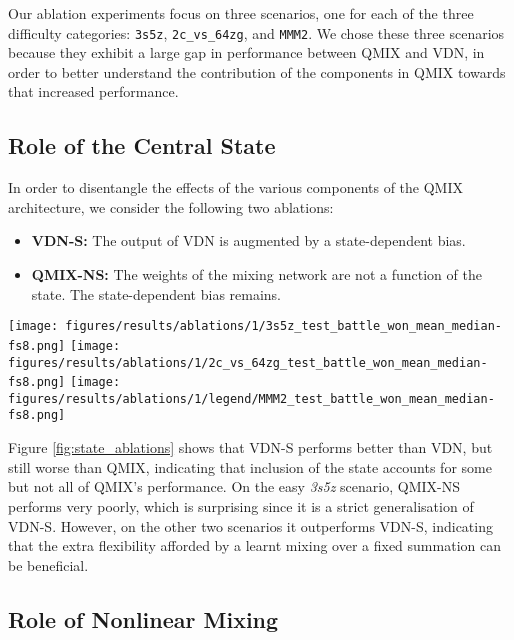 \documentclass[twoside,11pt]{article}
\begin{document}
Our ablation experiments focus on three scenarios, one for each of the three difficulty categories: \texttt{3s5z}, \texttt{2c\_vs\_64zg}, and \texttt{MMM2}.
We chose these three scenarios because they exhibit a large gap in performance between QMIX and VDN, in order to better understand the contribution of the components in QMIX towards that increased performance.

\subsection{Role of the Central State}

In order to disentangle the effects of the various components of the QMIX architecture, we consider the following two ablations:

\begin{itemize}
    \item \textbf{VDN-S:} The output of VDN is augmented by a state-dependent bias.
    \item \textbf{QMIX-NS:} The weights of the mixing network are not a function of the state. The state-dependent bias remains.
\end{itemize}


\begin{figure*}[h!]
    \centering
    \texttt{[image: figures/results/ablations/1/3s5z\_test\_battle\_won\_mean\_median-fs8.png]}
    \texttt{[image: figures/results/ablations/1/2c\_vs\_64zg\_test\_battle\_won\_mean\_median-fs8.png]}
    \texttt{[image: figures/results/ablations/1/legend/MMM2\_test\_battle\_won\_mean\_median-fs8.png]}
    \caption{Ablations for state experiments.}
    \label{fig:state_ablations}
\end{figure*}

Figure \ref{fig:state_ablations} shows that VDN-S performs better than VDN, but still worse than QMIX, indicating that inclusion of the state accounts for some but not all of QMIX's performance. 
On the easy \textit{3s5z} scenario, QMIX-NS performs very poorly, which is surprising since it is a strict generalisation of VDN-S. 
However, on the other two scenarios it outperforms VDN-S, indicating that the extra flexibility afforded by a learnt mixing over a fixed summation can be beneficial. 


\subsection{Role of Nonlinear Mixing}
\end{document}
